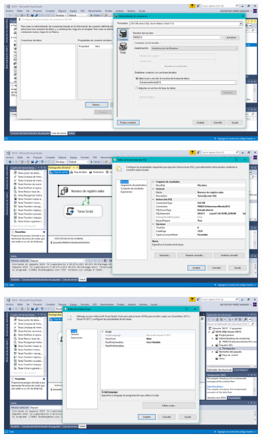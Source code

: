 {\begin{center}
\includegraphics[width=15cm]{./Imagenes/imagen19}
\end{center}
\begin{center}
\includegraphics[width=15cm]{./Imagenes/imagen20}
\end{center}
\begin{center}
\includegraphics[width=15cm]{./Imagenes/imagen21}
\end{center}
\begin{center}

\end{center}}
